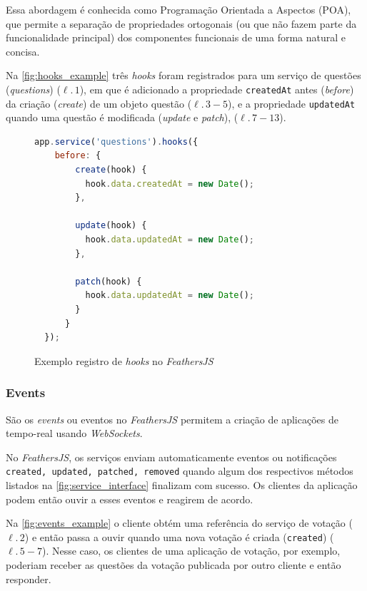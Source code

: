 Essa abordagem é conhecida como Programação Orientada a Aspectos (POA), que permite
a separação de propriedades ortogonais (ou que não fazem parte da funcionalidade
principal) dos componentes funcionais de uma forma natural e concisa.

Na \autoref{fig:hooks_example} três \textit{hooks} foram registrados para um serviço de questões (\textit{questions}) ($\ell.\,1$),
em que é adicionado a propriedade \texttt{createdAt} antes (\textit{before}) da criação (\textit{create}) de um objeto questão ($\ell.\,3-5$),
e a propriedade \texttt{updatedAt} quando uma questão é modificada (\textit{update} e \textit{patch}), ($\ell.\,7-13$).

\begin{figure}[h]
\begin{lstlisting}[language=JavaScript]
  app.service('questions').hooks({
    before: {
        create(hook) {
          hook.data.createdAt = new Date();
        },

        update(hook) {
          hook.data.updatedAt = new Date();
        },

        patch(hook) {
          hook.data.updatedAt = new Date();
        }
      }
  });
\end{lstlisting}
\caption{Exemplo registro de \textit{hooks} no \textit{\textit{FeathersJS}}}
\label{fig:hooks_example}
\end{figure}

\subsubsection{Events}

São os \textit{events} ou eventos no \textit{\textit{FeathersJS}} permitem
a criação de aplicações de tempo-real usando \textit{WebSockets}.

No \textit{\textit{FeathersJS}}, os serviços enviam automaticamente eventos ou notificações
\texttt{created, updated, patched, removed} quando algum dos respectivos métodos listados
na \autoref{fig:service_interface} finalizam com sucesso.
Os clientes da aplicação podem então ouvir a esses eventos e reagirem de acordo.

Na \autoref{fig:events_example} o cliente obtém uma referência do serviço
de votação ($\ell.\,2$) e então passa a ouvir quando uma nova votação é criada (\texttt{created}) ($\ell.\,5-7$).
Nesse caso, os clientes de uma aplicação de votação, por exemplo, poderiam
receber as questões da votação publicada por outro cliente e então responder.

